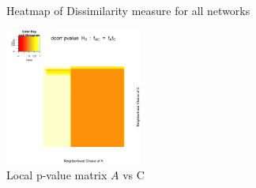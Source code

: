 \documentclass[12pt]{report}
\begin{document}
\begin{figure}[H]
\captionsetup{format=plain}
\caption{Heatmap of Dissimilarity measure for all networks}
\label{fig:table}    
\end{figure}


\begin{figure}[H]
\captionsetup{format=plain}
\centering
\includegraphics[width=0.4\textwidth]{../figure/P_A_C.png}
\caption{Local p-value matrix $A$ vs C}
\label{fig:PAC}
\end{figure} 
\end{document}
